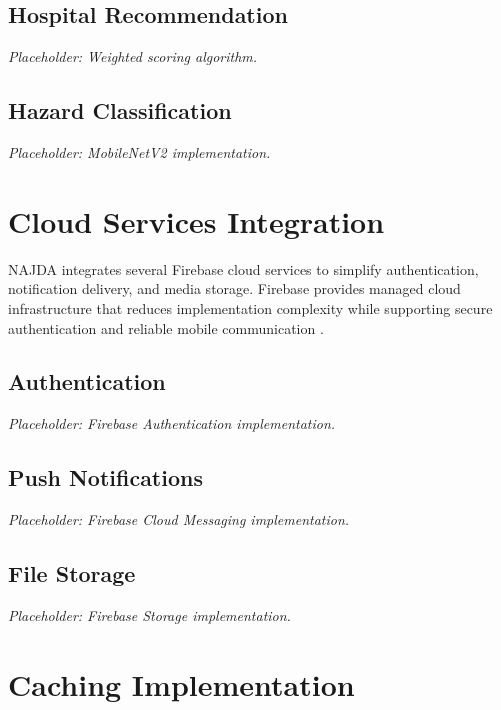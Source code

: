 \subsection{Hospital Recommendation}

\textit{Placeholder: Weighted scoring algorithm.}

\subsection{Hazard Classification}

\textit{Placeholder: MobileNetV2 implementation.}


\section{Cloud Services Integration}

NAJDA integrates several Firebase cloud services to simplify authentication, notification delivery, and media storage. Firebase provides managed cloud infrastructure that reduces implementation complexity while supporting secure authentication and reliable mobile communication \cite{firebase}.

\subsection{Authentication}

\textit{Placeholder: Firebase Authentication implementation.}

\subsection{Push Notifications}

\textit{Placeholder: Firebase Cloud Messaging implementation.}

\subsection{File Storage}

\textit{Placeholder: Firebase Storage implementation.}


\section{Caching Implementation}

